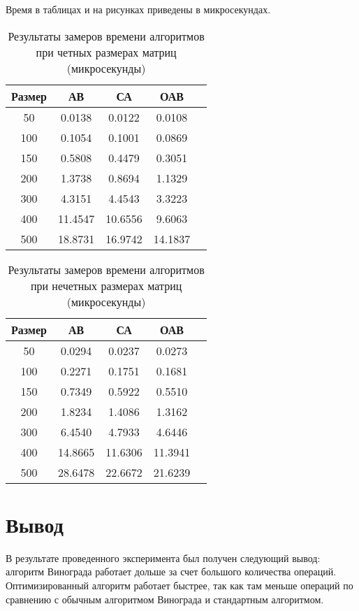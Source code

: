 Время в таблицах и на рисунках приведены в микросекундах.

\begin{table}[h]
	\begin{center}
		\captionsetup{justification=raggedright,singlelinecheck=off}
		\caption{\label{tab:time1}Результаты замеров времени алгоритмов при четных размерах матриц (микросекунды)}
		\begin{tabular}{|c|c|c|c|c|}
		\hline
		Размер & АВ &  СА & ОАВ \\
		\hline
		50  & 0.0138 & 0.0122 & 0.0108\\
		\hline
		100  & 0.1054 & 0.1001 & 0.0869\\
		\hline
		150  & 0.5808 & 0.4479 & 0.3051 \\
		\hline
		200  & 1.3738 & 0.8694 & 1.1329 \\
		\hline
		300  & 4.3151 & 4.4543 & 3.3223 \\
		\hline
		400  & 11.4547 & 10.6556 & 9.6063 \\
		\hline
		500  & 18.8731 & 16.9742 & 14.1837 \\
		\hline
		
		\end{tabular}
	\end{center}
\end{table}


\begin{table}[h]
	\begin{center}
		\captionsetup{justification=raggedright,singlelinecheck=off}
		\caption{\label{tab:time2}Результаты замеров времени алгоритмов при нечетных размерах матриц (микросекунды)}
		\begin{tabular}{|c|c|c|c|c|}
		\hline
		Размер & АВ &  СА & ОАВ \\
		\hline
		50  &0.0294 & 0.0237 & 0.0273\\
		\hline
		100  &0.2271 & 0.1751 & 0.1681\\
		\hline
		150  &0.7349 & 0.5922 & 0.5510 \\
		\hline
		200  &1.8234 &1.4086 & 1.3162 \\
		\hline
		300  & 6.4540 &4.7933 & 4.6446 \\
		\hline
		400  & 14.8665 & 11.6306 & 11.3941 \\
		\hline
		500  & 28.6478 & 22.6672 & 21.6239 \\
		\hline
		\end{tabular}
	\end{center}
\end{table}


\clearpage

\section*{Вывод}

В результате проведенного эксперимента был получен следующий вывод: алгоритм Винограда работает дольше за счет большого количества операций. Оптимизированный алгоритм работает быстрее, так как там меньше операций по сравнению с обычным алгоритмом Винограда и стандартным алгоритмом.  